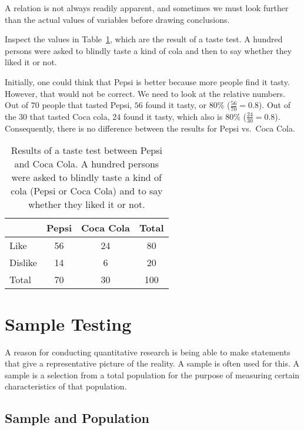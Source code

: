 A relation is not always readily apparent, and sometimes we must look further than the actual values of variables before drawing conclusions.

\begin{example}
    Inspect the values in Table~\ref{tab:pepsi-coca}, which are the result of a taste test. 
    A hundred persons were asked to blindly taste a kind of cola and then to say whether they liked it or not.
    
    Initially, one could think that Pepsi is better because more people find it tasty. 
    However, that would not be correct. We need to look at the relative numbers. 
    Out of $70$ people that tasted Pepsi, $56$ found it tasty, or $80\%$ ($\frac{56}{70} = 0.8$). 
    Out of the $30$ that tasted Coca cola, $24$ found it tasty, which also is $80\%$ ($\frac{24}{30} = 0.8$). 
    Consequently, there is no difference between the results for Pepsi vs.~Coca Cola.
\end{example}    

\begin{table}
    \centering
    \begin{tabular}{l|cc|c}
                  & Pepsi & Coca Cola & Total \\
        \midrule
        Like      &  56   &    24     &   80  \\
        Dislike   &  14   &     6     &   20  \\
        \midrule
        Total     &  70   &    30     &  100
    \end{tabular}
    \caption[Results of a taste test between Pepsi and Coca Cola.]{Results of a taste test between Pepsi and Coca Cola. A hundred persons were asked to blindly taste a kind of cola (Pepsi or Coca Cola) and to say whether they liked it or not.}
    \label{tab:pepsi-coca}
\end{table}

\section{Sample Testing}
\label{sec:onderzoeksproces-steekproefonderzoek}

A reason for conducting quantitative research is being able to make statements that give a representative picture of the reality. A sample is often used for this. A sample is a selection from a total population for the purpose of measuring certain characteristics of that population.

\subsection{Sample and Population}

